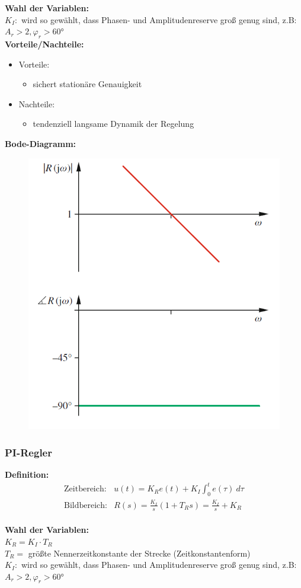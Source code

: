 \documentclass[10pt,a4paper]{article}
\begin{document}
\textbf{Wahl der Variablen:} \\
$K_I:$ wird so gewählt, dass Phasen- und Amplitudenreserve groß genug sind, z.B: $A_r > 2, \varphi_r > 60°$ \\

\textbf{Vorteile/Nachteile:}
\begin{itemize}
	\item Vorteile:
	\begin{itemize}
		\item sichert stationäre Genauigkeit
	\end{itemize}
	\item Nachteile:
	\begin{itemize}
		\item tendenziell langsame Dynamik der Regelung
	\end{itemize}
\end{itemize}

\textbf{Bode-Diagramm:}
\begin{figure}[H]
	\includegraphics[width = 0.4\columnwidth]{imgs/i-regler.png}
\end{figure}

\subsubsection{PI-Regler}
\textbf{Definition:}
$$
	\begin{array}{ll}
	\text{Zeitbereich:} & u(t) = K_R e(t) + K_I \int_0^t e(\tau) ~d\tau \\
	\text{Bildbereich:} & R(s) = \frac{K_I}{s} (1 + T_R s) = \frac{K_I}{s} + K_R
	\end{array}
$$ \\

\textbf{Wahl der Variablen:} \\
$K_R = K_I ⋅ T_R$  \\
$T_R =$ größte Nennerzeitkonstante der Strecke (Zeitkonstantenform) \\
$K_I:$ wird so gewählt, dass Phasen- und Amplitudenreserve groß genug sind, z.B: $A_r > 2, \varphi_r > 60°$ \\
\end{document}
